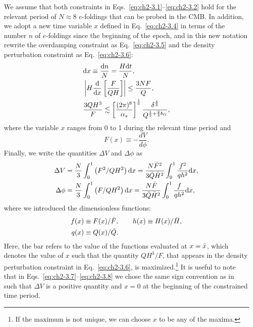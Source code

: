 We assume that both constraints in Eqs.~\ref{eq:ch2-3.1}--\ref{eq:ch2-3.2} hold for the relevant period of $N\approx8$ $e$-foldings that can be probed in the CMB. In addition, we adopt a new time variable $x$ defined in Eq.~\ref{eq:ch2-3.4} in terms of the number $n$ of $e$-foldings since the beginning of the epoch, and in this new notation rewrite the overdamping constraint as Eq.~\ref{eq:ch2-3.5} and the density perturbation constraint as Eq.~\ref{eq:ch2-3.6}:
\begin{align}
    &{\rm d}x\equiv \frac{{\rm d}n}{N}=\frac{H{\rm d}t}{N}, \label{eq:ch2-3.4} \\
    &\left|H \frac{{\rm d}}{{\rm d} x}\left[\frac{F}{QH}\right]\right| \leq \frac{3 N F}{Q}, \label{eq:ch2-3.5} \\
    &\frac{3QH^3}{F}\lesssim \left[\frac{(2\pi)^8}{\alpha_s}\right]^{\frac{1}{6}}\frac{\delta^{\frac{4}{3}}}{Q^{\frac{1}{2}+\frac{2}{3}b_G}}, \label{eq:ch2-3.6}
\end{align}
where the variable $x$ ranges from 0 to 1 during the
relevant time period and
\begin{equation}
 F(x)\equiv -\frac{dV}{d\phi}.
\end{equation}
 Finally, we write the quantities $\Delta V$ and $\Delta \phi$ as
\begin{align}
    \Delta V&=\frac{N}{3} \int_{0}^{1}\left(F^{2} / QH^{2}\right) {\rm d} x=\frac{N\Bar{F}^2}{3\Bar{Q}\Bar{H}^2}\int^1_0\frac{f^2}{qh^2}{\rm d} x, \label{eq:ch2-3.7}\\
    \Delta \phi&=\frac{N}{3} \int_{0}^{1}\left(F / QH^{2}\right) {\rm d} x =\frac{N\bar{F}}{3\Bar{Q}\Bar{H}^2}\int^1_0\frac{f}{qh^2}{\rm d} x, \label{eq:ch2-3.8}
\end{align}
where we introduced the dimensionless functions:
\begin{align}
    f(x)&\equiv F(x)/\Bar{F}, \qquad h(x)\equiv H(x)/\Bar{H}, \nonumber\\
    q(x)&\equiv Q(x)/\Bar{Q}. \label{eq:ch2-3.9}
\end{align}
Here, the bar refers to the value of the functions evaluated at $x=\Bar{x}$, which denotes the value of $x$ such that the quantity $QH^3/F$, that appears in the density perturbation constraint in Eq.~\ref{eq:ch2-3.6}, is maximized.\footnote{If the maximum is not unique, we can choose $x$ to be any of the maxima.} It is useful to note that in Eqs.~\ref{eq:ch2-3.7}--\ref{eq:ch2-3.8} we chose the same sign convention as in~\citep{Adams:1990pn} such that $\Delta V$ is a positive quantity and $x=0$ at the beginning of the constrained time period.

